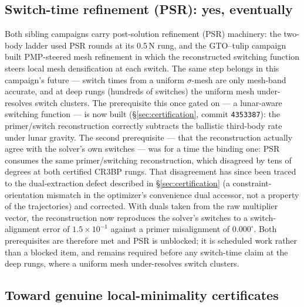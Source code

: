 \documentclass[11pt]{article}
\begin{document}
\subsection{Switch-time refinement (PSR): yes, eventually}

Both sibling campaigns carry post-solution refinement (PSR) machinery: the
two-body ladder used PSR rounds at its 0.5\,N rung, and the GTO--tulip
campaign built PMP-steered mesh refinement in which the reconstructed
switching function steers local mesh densification at each switch. The same
step belongs in this campaign's future --- switch times from a uniform
$\sigma$-mesh are only mesh-band accurate, and at deep rungs (hundreds of
switches) the uniform mesh under-resolves switch clusters. The prerequisite
this once gated on --- a lunar-aware switching function --- is now built
(\S\ref{sec:certification}, commit \texttt{4353387}): the primer/switch
reconstruction correctly subtracts the ballistic third-body rate under
lunar gravity. The second prerequisite --- that the reconstruction actually
agree with the solver's own switches --- was for a time the binding one: PSR
consumes the same primer/switching reconstruction, which disagreed by tens
of degrees at both certified CR3BP rungs. That disagreement has since been
traced to the dual-extraction defect described in \S\ref{sec:certification}
(a constraint-orientation mismatch in the optimizer's convenience dual
accessor, not a property of the trajectories) and corrected. With duals taken
from the raw multiplier vector, the reconstruction now reproduces the
solver's switches to a switch-alignment error of $1.5\times10^{-1}$ against a
primer misalignment of $0.000^\circ$. Both prerequisites are therefore met
and PSR is unblocked; it is scheduled work rather than a blocked item, and
remains required before any switch-time claim at the deep rungs, where a
uniform mesh under-resolves switch clusters.

\subsection{Toward genuine local-minimality certificates}
\label{sec:secondorder}
\end{document}
